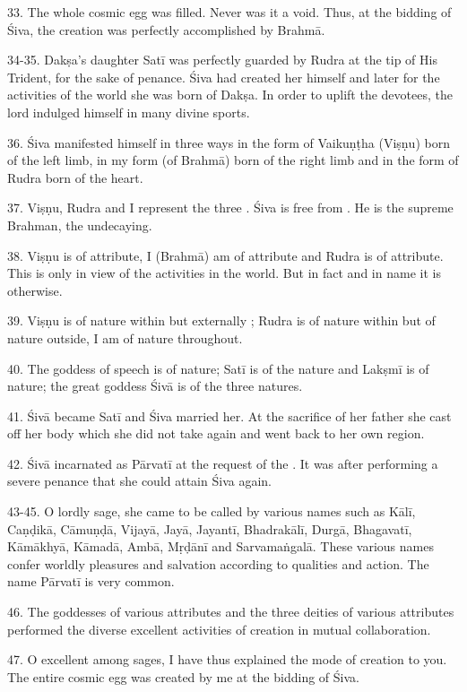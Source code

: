 33. The whole cosmic egg was filled. Never was it a void. Thus, at the bidding
of Śiva, the creation was perfectly accomplished by Brahmā.

34-35. Dakṣa’s daughter Satī was perfectly guarded by Rudra at the tip of His
Trident, for the sake of penance. Śiva had created her himself and later for
the activities of the world she was born of Dakṣa. In order to uplift
the devotees, the lord indulged himself in many divine sports.

36. Śiva manifested himself in three ways in the form of Vaikuṇṭha (Viṣṇu) born
of the left limb, in my form (of Brahmā) born of the right limb and in the form
of Rudra born of the heart.

37. Viṣṇu, Rudra and I represent the three . Śiva is free from
. He is the supreme Brahman, the undecaying.

38. Viṣṇu is of  attribute, I (Brahmā) am of  attribute and
Rudra is of  attribute. This is only in view of the activities in
the world. But in fact and in name it is otherwise.

39. Viṣṇu is of  nature within but externally ; Rudra
is of  nature within but of  nature outside, I am of
 nature throughout.

40. The goddess of speech is of  nature; Satī is of
the  nature and Lakṣmī is of  nature; the great goddess
Śivā is of the three natures.

41. Śivā became Satī and Śiva married her. At the sacrifice of her father she
cast off her body which she did not take again and went back to her own region.

42. Śivā incarnated as Pārvatī at the request of the . It was after
performing a severe penance that she could attain Śiva again.

43-45. O lordly sage, she came to be called by various names such as Kālī,
Caṇḍikā, Cāmuṇḍā, Vijayā, Jayā, Jayantī, Bhadrakālī, Durgā, Bhagavatī, Kāmākhyā,
Kāmadā, Ambā, Mṛḍānī and Sarvamaṅgalā. These various names confer worldly
pleasures and salvation according to qualities and action. The name Pārvatī is
very common.

46. The goddesses of various attributes and the three deities of various
attributes performed the diverse excellent activities of creation in mutual
collaboration.

47. O excellent among sages, I have thus explained the mode of creation to you.
The entire cosmic egg was created by me at the bidding of Śiva.

